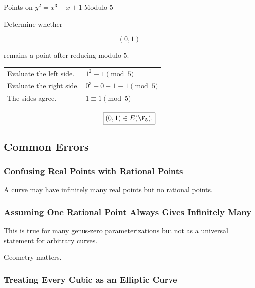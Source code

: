 \begin{workedexamplebox}{Points on \(y^2=x^3-x+1\) Modulo \(5\)}

Determine whether

\[ (0,1) \]

remains a point after reducing modulo \(5\).

\begin{tabularx}{\textwidth}{@{}>{\raggedright\arraybackslash}p{}X@{}}
Evaluate the left side. & \(1^2\equiv1\pmod5\)\\
Evaluate the right side. & \(0^3-0+1\equiv1\pmod5\)\\
The sides agree. & \(1\equiv1\pmod5\)
\end{tabularx}

\begin{answerbox}
\[ \boxed{(0,1)\in E(\F_5).} \]
\end{answerbox}
\end{workedexamplebox}

\subsection{Common Errors}
\label{subsec:diophantine-geometry-common-errors}

\subsubsection{Confusing Real Points with Rational Points}

A curve may have infinitely many real points but no rational points.

\subsubsection{Assuming One Rational Point Always Gives Infinitely Many}

This is true for many genus-zero parameterizations but not as a universal
statement for arbitrary curves.

Geometry matters.

\subsubsection{Treating Every Cubic as an Elliptic Curve}

